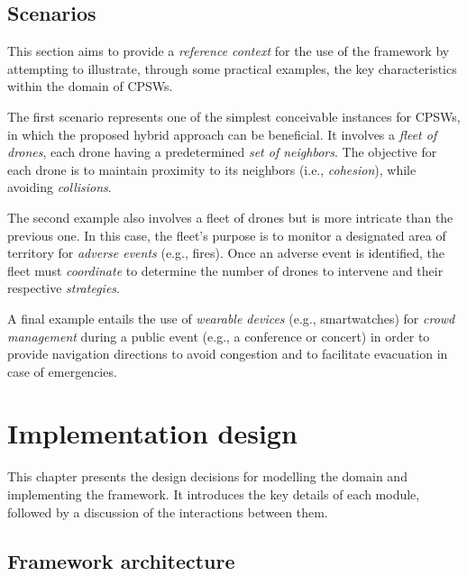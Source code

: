 \documentclass[12pt,a4paper,openright,twoside]{book}
\begin{document}
\section{Scenarios}

This section aims to provide a \emph{reference context} for the use of the framework by attempting to illustrate, 
    through some practical examples, the key characteristics within the domain of CPSWs.

The first scenario represents one of the simplest conceivable instances for CPSWs, in which the proposed hybrid 
    approach can be beneficial. It involves a \emph{fleet of drones}, each drone having a predetermined \emph{set of neighbors}. 
    The objective for each drone is to maintain proximity to its neighbors (i.e., \emph{cohesion}), while avoiding \emph{collisions}.

The second example also involves a fleet of drones but is more intricate than the previous one. In this case, 
    the fleet's purpose is to monitor a designated area of territory for \emph{adverse events} (e.g., fires). Once an adverse 
    event is identified, the fleet must \emph{coordinate} to determine the number of drones to intervene and their 
    respective \emph{strategies}.

A final example entails the use of \emph{wearable devices} (e.g., smartwatches) for \emph{crowd management} during a public event 
    (e.g., a conference or concert) in order to provide navigation directions to avoid congestion and to facilitate 
    evacuation in case of emergencies.


\chapter{Implementation design} 
\label{chap:impl-design}

This chapter presents the design decisions for modelling the domain and implementing 
    the framework. It introduces the key details of each module, followed by a discussion
    of the interactions between them.

\section{Framework architecture}
\end{document}
